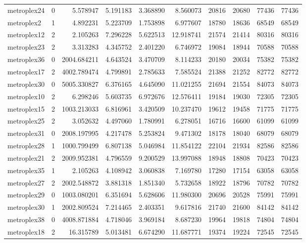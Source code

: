 \begin{longtable}{|l|r|r|r|r|r|r|r|r|r|}
metroplex24 & 0 & 5.578947 & 5.191183 & 3.368890 & 8.560073 & 20816 & 20680 & 77436 & 77436 \\
metroplex2 & 1 & 4.892231 & 5.223709 & 1.753898 & 6.977607 & 18780 & 18636 & 68549 & 68549 \\
metroplex12 & 2 & 2.105263 & 7.296228 & 5.622513 & 12.918741 & 21574 & 21414 & 80316 & 80316 \\
metroplex23 & 2 & 3.313283 & 4.345752 & 2.401220 & 6.746972 & 19084 & 18944 & 70588 & 70588 \\
metroplex36 & 0 & 2004.684211 & 4.643524 & 3.470709 & 8.114233 & 20180 & 20034 & 75382 & 75382 \\
metroplex17 & 2 & 4002.789474 & 4.799891 & 2.785633 & 7.585524 & 21388 & 21252 & 82772 & 82772 \\
metroplex30 & 0 & 5005.330827 & 6.376165 & 4.645090 & 11.021255 & 21694 & 21554 & 84073 & 84073 \\
metroplex10 & 2 & 6.298246 & 5.603735 & 6.972676 & 12.576411 & 19184 & 19030 & 72305 & 72305 \\
metroplex15 & 2 & 1003.213033 & 6.816961 & 3.420509 & 10.237470 & 19612 & 19458 & 71775 & 71775 \\
metroplex25 & 2 & 3.052632 & 4.497060 & 1.780991 & 6.278051 & 16716 & 16600 & 61099 & 61099 \\
metroplex31 & 0 & 2008.197995 & 4.217478 & 5.253824 & 9.471302 & 18178 & 18040 & 68079 & 68079 \\
metroplex28 & 1 & 1000.799499 & 6.807138 & 5.046984 & 11.854122 & 22104 & 21934 & 82586 & 82586 \\
metroplex21 & 2 & 2009.952381 & 4.796559 & 9.200529 & 13.997088 & 18948 & 18808 & 70423 & 70423 \\
metroplex35 & 1 & 2.105263 & 4.108942 & 3.060838 & 7.169780 & 17280 & 17154 & 63058 & 63058 \\
metroplex27 & 2 & 2002.548872 & 3.881318 & 1.851340 & 5.732658 & 18922 & 18796 & 70782 & 70782 \\
metroplex29 & 0 & 1003.080201 & 6.351694 & 5.628606 & 11.980300 & 20696 & 20528 & 75991 & 75991 \\
metroplex30 & 1 & 2002.809524 & 7.214465 & 2.403351 & 9.617816 & 21740 & 21600 & 84142 & 84142 \\
metroplex38 & 0 & 4008.871884 & 4.718046 & 3.969184 & 8.687230 & 19964 & 19818 & 74804 & 74804 \\
metroplex18 & 2 & 16.315789 & 5.013481 & 6.674290 & 11.687771 & 19374 & 19224 & 72545 & 72545 \\

\end{longtable}
